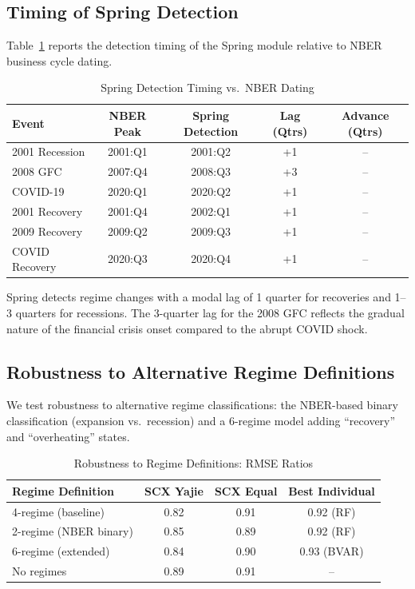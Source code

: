 \documentclass[12pt,a4paper]{article}
\begin{document}
\subsection{Timing of Spring Detection}

Table~\ref{tab:spring_timing} reports the detection timing of
the Spring module relative to NBER business cycle dating.

\begin{table}[htbp]
\centering
\caption{Spring Detection Timing vs.\ NBER Dating}
\label{tab:spring_timing}
\begin{tabular}{lcccc}
\toprule
Event & NBER Peak & Spring Detection & Lag (Qtrs) & Advance (Qtrs) \\
\midrule
2001 Recession    & 2001:Q1 & 2001:Q2 & +1 & -- \\
2008 GFC          & 2007:Q4 & 2008:Q3 & +3 & -- \\
COVID-19          & 2020:Q1 & 2020:Q2 & +1 & -- \\
\midrule
2001 Recovery     & 2001:Q4 & 2002:Q1 & +1 & -- \\
2009 Recovery     & 2009:Q2 & 2009:Q3 & +1 & -- \\
COVID Recovery    & 2020:Q3 & 2020:Q4 & +1 & -- \\
\bottomrule
\end{tabular}
\end{table}

Spring detects regime changes with a modal lag of 1 quarter for
recoveries and 1--3 quarters for recessions.  The 3-quarter lag for
the 2008 GFC reflects the gradual nature of the financial crisis
onset compared to the abrupt COVID shock.

\subsection{Robustness to Alternative Regime Definitions}

We test robustness to alternative regime classifications: the
NBER-based binary classification (expansion vs.\ recession) and a
6-regime model adding ``recovery'' and ``overheating'' states.

\begin{table}[htbp]
\centering
\caption{Robustness to Regime Definitions: RMSE Ratios}
\label{tab:robustness}
\begin{tabular}{lccc}
\toprule
Regime Definition & SCX Yajie & SCX Equal & Best Individual \\
\midrule
4-regime (baseline)      & 0.82 & 0.91 & 0.92 (RF) \\
2-regime (NBER binary)   & 0.85 & 0.89 & 0.92 (RF) \\
6-regime (extended)      & 0.84 & 0.90 & 0.93 (BVAR) \\
No regimes               & 0.89 & 0.91 & -- \\
\bottomrule
\end{tabular}
\end{table}
\end{document}
